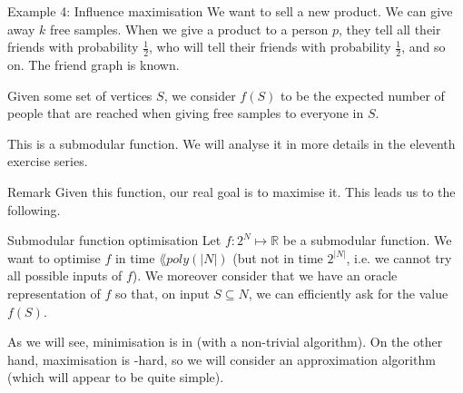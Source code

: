 \documentclass[a4paper]{article}
\begin{document}
\begin{parag}{Example 4: Influence maximisation}
    We want to sell a new product. We can give away $k$ free samples. When we give a product to a person $p$, they tell all their friends with probability $\frac{1}{2}$, who will tell their friends with probability $\frac{1}{2}$, and so on. The friend graph is known.

    Given some set of vertices $S$, we consider $f\left(S\right)$ to be the expected number of people that are reached when giving free samples to everyone in $S$. 

    This is a submodular function. We will analyse it in more details in the eleventh exercise series.

    \begin{subparag}{Remark}
        Given this function, our real goal is to maximise it. This leads us to the following.
    \end{subparag}
\end{parag}

\begin{parag}{Submodular function optimisation}
    Let $f: 2^N \mapsto \mathbb{R}$ be a submodular function. We want to optimise $f$ in time $\lang{poly}\left(\left|N\right|\right)$ (but not in time $2^{\left|N\right|}$, i.e. we cannot try all possible inputs of $f$). We moreover consider that we have an oracle representation of $f$ so that, on input $S \subseteq N$, we can efficiently ask for the value $f\left(S\right)$.

    As we will see, minimisation is in  (with a non-trivial algorithm). On the other hand, maximisation is -hard, so we will consider an approximation algorithm (which will appear to be quite simple). 
\end{parag}
\end{document}
